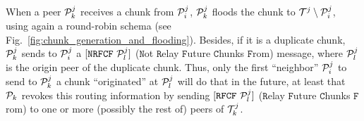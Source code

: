 %
%

When a peer ${\cal P}^j_k$ receives a chunk from ${\cal P}^j_i$,
${\cal P}^j_k$ floods the chunk to ${\cal T}^j \setminus {\cal
P}^j_i$, using again a round-robin schema (see
Fig.~\ref{fig:chunk_generation_and_flooding}). Besides, if it is a
duplicate chunk, ${\cal P}^j_k$ sends to ${\cal P}^j_i$ a
$[\mathtt{NRFCF}~{\cal P}^j_l]$ ($\mathtt{N}$ot $\mathtt{R}$elay
$\mathtt{F}$uture $\mathtt{C}$hunks $\mathtt{F}$rom) message, where
${\cal P}^j_l$ is the origin peer of the duplicate chunk. Thus, only
the first ``neighbor'' ${\cal P}^j_i$ to send to ${\cal P}^j_k$ a
chunk ``originated'' at ${\cal P}^j_l$ will do that in the future, at
least that ${\cal P}_k$ revokes this routing information by sending
$[\mathtt{RFCF}~{\cal P}^j_l]$ ($\mathtt{R}$elay $\mathtt{F}$uture
$\mathtt{C}$hunks $\mathtt{F}$rom) to one or more (possibly the rest
of) peers of ${\cal T}^j_k$.

